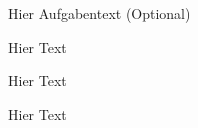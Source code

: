 \tbd
\begin{frage}
Hier Aufgabentext (Optional)
\end{frage}
Hier Text

\teil
Hier Text 

\teil
Hier Text